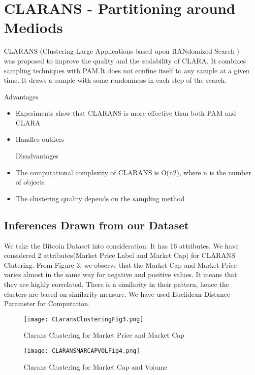 \documentclass{article}
\begin{document}
\section{CLARANS - Partitioning around Mediods}

CLARANS (Clustering Large Applications based upon
RANdomized Search ) was proposed to improve the quality and the scalability of CLARA. It combines sampling techniques with PAM.It does not confine itself to any sample at a given time.
It draws a sample with some randomness in each step of the search. \newline

Advantages
\begin {itemize}
\item Experiments show that CLARANS is more effective than both PAM
and CLARA
\item Handles outliers 

Disadvantages
\item The computational complexity of CLARANS is O(n2), where n is the
number of objects
\item The clustering quality depends on the sampling method
\end{itemize}


\subsection{Inferences Drawn from our Dataset}
We take the Bitcoin Dataset into consideration. It has 16 attributes. We have considered 2 attributes(Market Price Label and Market Cap)  for CLARANS Clutering. From Figure 3, we observe that the Market Cap and Market Price varies almost in the same way for negative and positive values. It means that they are highly correlated. There is a similarity in their pattern, hence the clusters are based on similarity measure. We  have used Euclidean Distance Parameter for Computation. \newine

\begin{figure}[h]
    \centering
    \texttt{[image: CLaransClusteringFig3.png]}
    \caption{Clarans Clustering for Market Price and Market Cap }
    \label{fig:my_label}
\end{figure}



\begin{figure}[h]
    \centering
    \texttt{[image: CLARANSMARCAPVOLFig4.png]}
    \caption{Clarans Clustering for Market Cap and Volume }
    \label{fig:my_label}
\end{figure}
\end{document}
